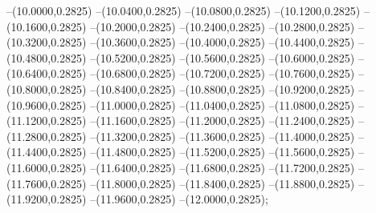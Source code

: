 {	--(10.0000,0.2825)
	--(10.0400,0.2825)
	--(10.0800,0.2825)
	--(10.1200,0.2825)
	--(10.1600,0.2825)
	--(10.2000,0.2825)
	--(10.2400,0.2825)
	--(10.2800,0.2825)
	--(10.3200,0.2825)
	--(10.3600,0.2825)
	--(10.4000,0.2825)
	--(10.4400,0.2825)
	--(10.4800,0.2825)
	--(10.5200,0.2825)
	--(10.5600,0.2825)
	--(10.6000,0.2825)
	--(10.6400,0.2825)
	--(10.6800,0.2825)
	--(10.7200,0.2825)
	--(10.7600,0.2825)
	--(10.8000,0.2825)
	--(10.8400,0.2825)
	--(10.8800,0.2825)
	--(10.9200,0.2825)
	--(10.9600,0.2825)
	--(11.0000,0.2825)
	--(11.0400,0.2825)
	--(11.0800,0.2825)
	--(11.1200,0.2825)
	--(11.1600,0.2825)
	--(11.2000,0.2825)
	--(11.2400,0.2825)
	--(11.2800,0.2825)
	--(11.3200,0.2825)
	--(11.3600,0.2825)
	--(11.4000,0.2825)
	--(11.4400,0.2825)
	--(11.4800,0.2825)
	--(11.5200,0.2825)
	--(11.5600,0.2825)
	--(11.6000,0.2825)
	--(11.6400,0.2825)
	--(11.6800,0.2825)
	--(11.7200,0.2825)
	--(11.7600,0.2825)
	--(11.8000,0.2825)
	--(11.8400,0.2825)
	--(11.8800,0.2825)
	--(11.9200,0.2825)
	--(11.9600,0.2825)
	--(12.0000,0.2825);
}
